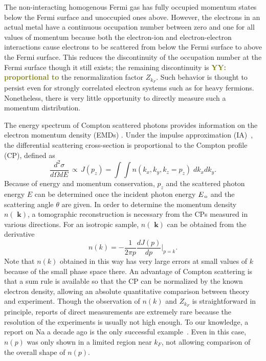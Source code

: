 \documentclass[twocolumn,showpacs,showkeys,fleqn,prl,superscriptaddress]{revtex4}%
\newcommand{\bb}[1]{\textbf{ #1}}
\newcommand{\nn}[1]{\textnormal{ #1}}
\newcommand{\yy}[1]{\textcolor{olive}{\textbf{YY: #1}}}
\begin{document}
The non-interacting homogenous Fermi gas has fully occupied momentum states below the  Fermi surface and unoccupied ones above.
However, the electrons in an actual metal have a continuous occupation number between zero and one for all values of momentum because both the electron-ion and electron-electron interactions cause electrons to be scattered from below the Fermi surface to above the Fermi surface. This reduces the discontinuity of the occupation number at the Fermi surface though it still exists; the remaining discontinuity is \yy{proportional to} the renormalization factor $Z_{k_F}$.
Such behavior
is thought to persist even for strongly correlated electron systems such as for heavy fermions.
Nonetheless, there is very little opportunity to   directly measure such a momentum distribution.

The energy spectrum of Compton scattered photons provides information on the  electron momentum density (EMDs) \cite{sch}.
Under the impulse approximation (IA)~\cite{eisen70,kaplan03}, the differential scattering cross-section is proportional to the Compton profile (CP), defined as
\begin{equation}
\frac{d^2\sigma}{d\Omega dE} \,\propto \, J(p_z) = \int \!\! \int n(k_x,k_y,k_z\!=\!p_z) \;dk_x dk_y .
\end{equation}
Because of energy and momentum conservation, $p_z$ and the scattered photon energy $E$ can be determined once the incident photon energy $E_{\nn{\!o}}$ and the scattering angle $\theta$ are given.
In order to determine the momentum density $n(\!\!\bb{k})$, a tomographic reconstruction is necessary from the CPs measured in various directions.
For an isotropic sample, $n(\!\!\bb{k})$ can be obtained from the derivative
\begin{equation}
n(k) = - \frac{1}{2 \pi p} \frac{d J(p)}{d p}  | _{p=k}   .
\end{equation}
Note that $n(k)$ obtained in this way has very large errors at small values of $k$ because of the small phase space there.
An advantage of Compton scattering is that a sum rule is available so that the CP can be normalized by the known electron density, allowing an absolute quantitative comparison between theory and experiment.
Though the observation of $n(k)$ and $Z_{k_F}$ is straightforward in principle, reports of direct measurements are extremely rare because the resolution of the experiments is usually not high enough.
To our knowledge, a report on Na a decade ago is the only successful example~\cite{simo10}.
Even in this case, $n(p)$ was only shown in a limited region near $k_F$, not allowing comparison of the overall shape of $n(p)$.
\end{document}
